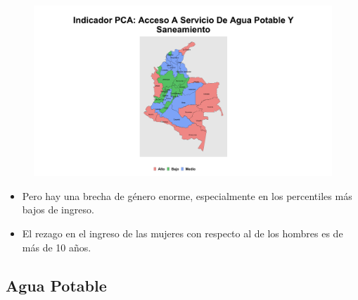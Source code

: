 \begin{figure}[H]
        \caption[Indicador Pulso Social sobre Acceso a servicios de agua potabla y saneamiento (PCA)]{\label{pca_pobreza} }
        \begin{center}
        \includegraphics[width=\textwidth,keepaspectratio]{pca_clusters/pca_acceso_a_servicio_de_agua_potable_y_saneamiento_pca.png}
        \end{center}
    \end{figure}

    \begin{tcolorbox}[enhanced, colback=mycolor,colframe=mycolor,drop fuzzy shadow,watermark color=white,
                        title=Principales Resultados]
    
                    \begin{itemize}
                    \item Pero hay una brecha de género enorme, especialmente en los percentiles más bajos de ingreso.
                    \item El rezago en el ingreso de las mujeres con respecto al de los hombres es de más de 10 años.
                \end{itemize}
     
    \end{tcolorbox}
    
    
    \subsection{Agua Potable}

